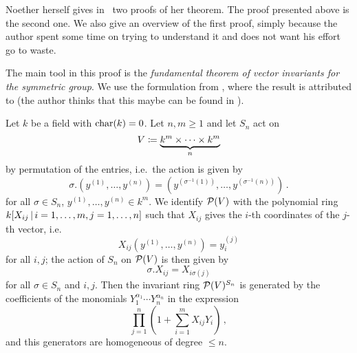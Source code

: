 \begin{fluff}
  Noether herself gives in~\cite{Noether1915} two proofs of her theorem.
  The proof presented above is the second one.
  We also give an overview of the first proof, simply because the author spent some time on trying to understand it and does not want his effort go to waste.
  
  The main tool in this proof is the \emph{fundamental theorem of vector invariants for the symmetric group}.
  We use the formulation from \cite{Fleischmann2000}, where the result is attributed to \cite{Weyl1946} (the author thinks that this maybe can be found in \cite[II.3]{Weyl1946}).
\end{fluff}


\begin{theorem}
  \label{theorem: fundamental theorem of vector invariants for the symmetric group}
  Let $k$ be a field with $\operatorname{char}(k) = 0$.
  Let $n, m \geq 1$ and let $S_n$ act on
  \[
              V
    \coloneqq  \underbrace{k^m \times \dotsb \times k^m}_n
  \]
  by permutation of the entries, i.e.\ the action is given by
  \[
      \sigma.\left( y^{(1)}, \dotsc, y^{(n)} \right)
    = \left( y^{(\sigma^{-1}(1))}, \dotsc, y^{(\sigma^{-1}(n))} \right) \,.
  \]
  for all $\sigma \in S_n$, $y^{(1)}, \dotsc, y^{(n)} \in k^m$.
  We identify $\mathcal{P}(V)$ with the polynomial ring $k[X_{ij} \suchthat i = 1, \dotsc, m, j = 1, \dotsc, n]$ such that $X_{ij}$ gives the $i$-th coordinates of the $j$-th vector, i.e.\
  \[
      X_{ij}(y^{(1)}, \dotsc, y^{(n)})
    = y^{(j)}_i
  \]
  for all $i,j$;
  the action of $S_n$ on $\mathcal{P}(V)$ is then given by
  \[
      \sigma.X_{ij}
    = X_{i \sigma(j)}
  \]
  for all $\sigma \in S_n$ and $i,j$.
  Then the invariant ring $\mathcal{P}(V)^{S_n}$ is generated by the coefficients of the monomials $Y_1^{\alpha_1} \dotsb Y_n^{\alpha_n}$ in the expression
  \[
    \prod_{j=1}^n \left( 1 + \sum_{i=1}^m X_{ij} Y_i \right) \,,
  \]
  and this generators are homogeneous of degree $\leq n$.
\end{theorem}


